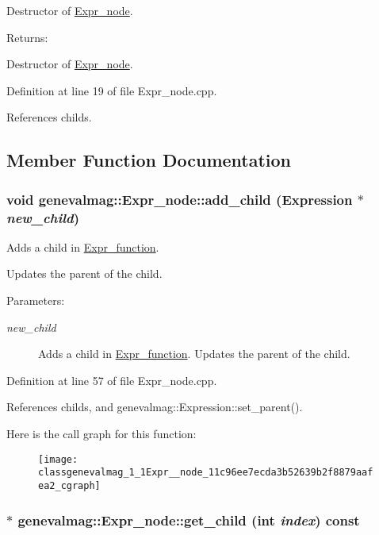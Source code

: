Destructor of \hyperlink{classgenevalmag_1_1Expr__node}{Expr\_\-node}. \begin{Desc}
\item[Returns:]\end{Desc}
Destructor of \hyperlink{classgenevalmag_1_1Expr__node}{Expr\_\-node}. 

Definition at line 19 of file Expr\_\-node.cpp.

References childs.

\subsection{Member Function Documentation}
\hypertarget{classgenevalmag_1_1Expr__node_11c96ee7ecda3b52639b2f8879aafea2}{
\subsubsection[{add\_\-child}]{\setlength{\rightskip}{0pt plus 5cm}void genevalmag::Expr\_\-node::add\_\-child ({\bf Expression} $\ast$ {\em new\_\-child})}}
\label{classgenevalmag_1_1Expr__node_11c96ee7ecda3b52639b2f8879aafea2}


Adds a child in \hyperlink{classgenevalmag_1_1Expr__function}{Expr\_\-function}.\par
 Updates the parent of the child. \begin{Desc}
\item[Parameters:]
\begin{description}
\item[{\em new\_\-child}]Adds a child in \hyperlink{classgenevalmag_1_1Expr__function}{Expr\_\-function}. Updates the parent of the child. \end{description}
\end{Desc}


Definition at line 57 of file Expr\_\-node.cpp.

References childs, and genevalmag::Expression::set\_\-parent().

Here is the call graph for this function:\nopagebreak
\begin{figure}[H]
\begin{center}
\leavevmode
\texttt{[image: classgenevalmag\_1\_1Expr\_\_node\_11c96ee7ecda3b52639b2f8879aafea2\_cgraph]}
\end{center}
\end{figure}
\hypertarget{classgenevalmag_1_1Expr__node_fd22b5e20b8723e957587aafe4e8e724}{
\subsubsection[{get\_\-child}]{ $\ast$ genevalmag::Expr\_\-node::get\_\-child (int {\em index}) const}}
\label{classgenevalmag_1_1Expr__node_fd22b5e20b8723e957587aafe4e8e724}


